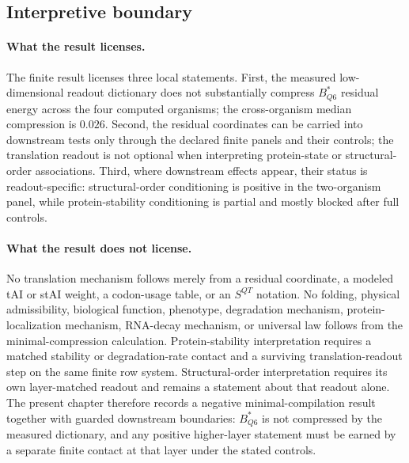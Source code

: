 \subsection{Interpretive boundary}
\label{sec:biorality-q6-minimal-compilation-boundary}

\paragraph{What the result licenses.}
The finite result licenses three local statements.  First, the measured low-dimensional readout dictionary does not substantially compress $B^*_{Q6}$ residual energy across the four computed organisms; the cross-organism median compression is $0.026$.  Second, the residual coordinates can be carried into downstream tests only through the declared finite panels and their controls; the translation readout is not optional when interpreting protein-state or structural-order associations.  Third, where downstream effects appear, their status is readout-specific: structural-order conditioning is positive in the two-organism panel, while protein-stability conditioning is partial and mostly blocked after full controls.

\paragraph{What the result does not license.}
No translation mechanism follows merely from a residual coordinate, a modeled tAI or stAI weight, a codon-usage table, or an $S^{QT}$ notation.  No folding, physical admissibility, biological function, phenotype, degradation mechanism, protein-localization mechanism, RNA-decay mechanism, or universal law follows from the minimal-compression calculation.  Protein-stability interpretation requires a matched stability or degradation-rate contact and a surviving translation-readout step on the same finite row system.  Structural-order interpretation requires its own layer-matched readout and remains a statement about that readout alone.  The present chapter therefore records a negative minimal-compilation result together with guarded downstream boundaries: $B^*_{Q6}$ is not compressed by the measured dictionary, and any positive higher-layer statement must be earned by a separate finite contact at that layer under the stated controls.
